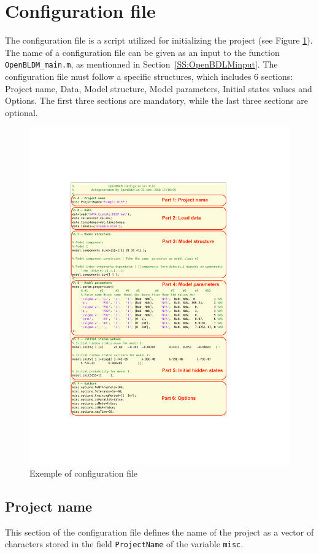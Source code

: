 \section{Configuration file}
\label{S:CFGFile}
The configuration file is a \MATLAB{} script utilized for initializing the project (see Figure \ref{fig:cfgfile}).
The name of a configuration file can be given as an input to the function   \lstinline[basicstyle = \mlttfamily \small ]!OpenBLDM_main.m!, as mentionned in Section~\ref{SS:OpenBDLMinput}.
The configuration file must follow a specific structures, which includes 6 sections: Project name, Data, Model structure, Model parameters, Initial states values and Options.
The first three sections are mandatory, while the last three sections are optional.
\begin{figure}[h!]
\centering
\includegraphics[width=115mm]{docfigs/Example_DISPSIM/listing/config_file_2.pdf}
\caption{Exemple of configuration file}
\label{fig:cfgfile}
\end{figure}

\subsection{Project name}
This section of the configuration file defines the name of the project as a vector of characters stored in the field \lstinline[basicstyle = \mlttfamily \small ]!ProjectName! of the \MATLAB{} variable \lstinline[basicstyle = \mlttfamily \small ]!misc!.

